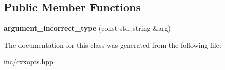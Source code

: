\subsection*{Public Member Functions}
\begin{DoxyCompactItemize}
\item 
{\bfseries argument\+\_\+incorrect\+\_\+type} (const std\+::string \&arg)\hypertarget{classcxxopts_1_1argument__incorrect__type_adf2fdc98794172201b1209c6d16dfceb}{}\label{classcxxopts_1_1argument__incorrect__type_adf2fdc98794172201b1209c6d16dfceb}

\end{DoxyCompactItemize}


The documentation for this class was generated from the following file\+:\begin{DoxyCompactItemize}
\item 
inc/cxxopts.\+hpp\end{DoxyCompactItemize}
